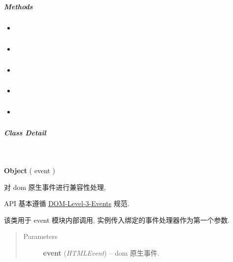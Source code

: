 \documentclass[letterpaper,10pt,english]{sphinxmanual}
\begin{document}
\subparagraph{Methods}
\label{api/core/event/event-object:methods}\begin{itemize}
\item {}
{\hyperref[api/core/event/event-object:Event.preventDefault]{}}

\item {}
{\hyperref[api/core/event/event-object:Event.stopImmediatePropagation]{}}

\item {}
{\hyperref[api/core/event/event-object:Event.stopPropagation]{}}

\item {}
{\hyperref[api/core/event/event-object:Event.isDefaultPrevented]{}}

\item {}
{\hyperref[api/core/event/event-object:Event.isPropagationStopped]{}}

\end{itemize}


\subparagraph{Class Detail}
\label{api/core/event/event-object:class-detail}

\begin{fulllineitems}
\label{api/core/event/event-object:Event.Object}~
\begin{DUlineblock}{0em}
\item[] \textbf{Object} ( event )
\item[] 对 dom 原生事件进行兼容性处理,
\item[] API 基本遵循 \href{http://www.w3.org/TR/2003/WD-DOM-Level-3-Events-20030331/ecma-script-binding.html}{DOM-Level-3-Events} 规范.
\item[] 该类用于 event 模块内部调用, 实例传入绑定的事件处理器作为第一个参数.
\end{DUlineblock}
\begin{quote}\begin{description}
\item[{Parameters}] \leavevmode
\textbf{event} (\emph{HTMLEvent}) -- dom 原生事件.

\end{description}\end{quote}

\end{fulllineitems}
\end{document}

